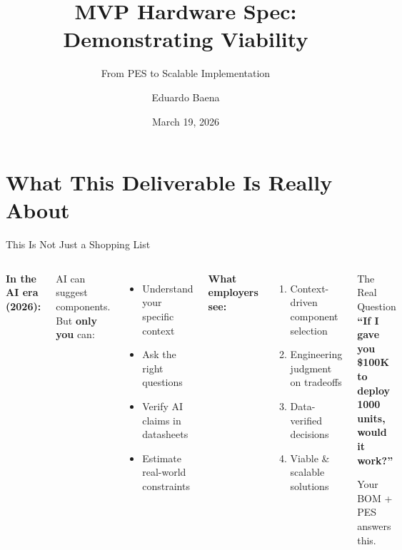 \documentclass[aspectratio=169,11pt]{beamer}
\title[BOM \& Project Viability]{MVP Hardware Spec: Demonstrating Viability}
\subtitle{From PES to Scalable Implementation}
\author{Eduardo Baena}
\date{March 19, 2026}
\institute{Northeastern University\\EECE5155: Wireless Sensor Networks and IoT}
\begin{document}
\begin{frame}
    \titlepage
\end{frame}

\section{What This Deliverable Is Really About}

\begin{frame}[shrink=5]{This Is Not Just a Shopping List}
    \begin{columns}
        \textbf{In the AI era (2026):}
        
        \vspace{0.15cm}
        AI can suggest components.\\But \textbf{only you} can:
        \begin{itemize}
            \item Understand your specific context
            \item Ask the right questions
            \item Verify AI claims in datasheets
            \item Estimate real-world constraints
        \end{itemize}
        
        \vspace{0.15cm}
        \textbf{What employers see:}
        \begin{enumerate}
            \item Context-driven component selection
            \item Engineering judgment on tradeoffs
            \item Data-verified decisions
            \item Viable \& scalable solutions
        \end{enumerate}
        
        \begin{alertblock}{The Real Question}
            \centering
            \textbf{``If I gave you \$100K to deploy 1000 units, would it work?''}
            
            \vspace{0.1cm}
            Your BOM + PES answers this.
        \end{alertblock}
        

\end{columns}
\end{frame}
\end{document}

